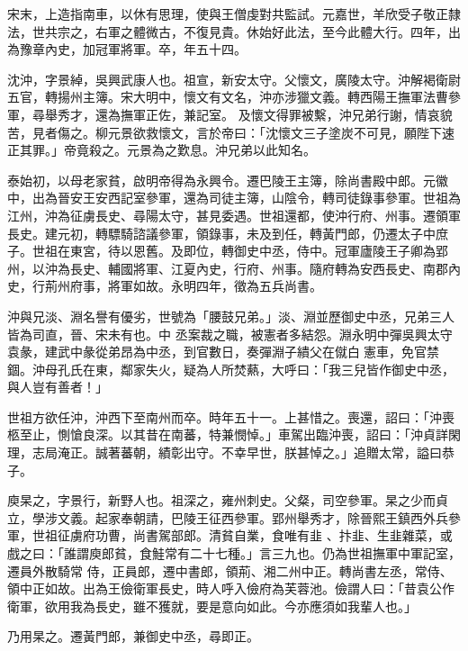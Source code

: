 \begin{pinyinscope}
 宋末，上造指南車，以休有思理，使與王僧虔對共監試。元嘉世，羊欣受子敬正隸法，世共宗之，右軍之體微古，不復見貴。休始好此法，至今此體大行。四年，出為豫章內史，加冠軍將軍。卒，年五十四。



 沈沖，字景綽，吳興武康人也。祖宣，新安太守。父懷文，廣陵太守。沖解褐衛尉五官，轉揚州主簿。宋大明中，懷文有文名，沖亦涉獵文義。轉西陽王撫軍法曹參軍，尋舉秀才，還為撫軍正佐，兼記室。
 及懷文得罪被繫，沖兄弟行謝，情哀貌苦，見者傷之。柳元景欲救懷文，言於帝曰：「沈懷文三子塗炭不可見，願陛下速正其罪。」帝竟殺之。元景為之歎息。沖兄弟以此知名。



 泰始初，以母老家貧，啟明帝得為永興令。遷巴陵王主簿，除尚書殿中郎。元徽中，出為晉安王安西記室參軍，還為司徒主簿，山陰令，轉司徒錄事參軍。世祖為江州，沖為征虜長史、尋陽太守，甚見委遇。世祖還都，使沖行府、州事。遷領軍長史。建元初，轉驃騎諮議參軍，領錄事，未及到任，轉黃門郎，仍遷太子中庶子。世祖在東宮，待以恩舊。及即位，轉御史中丞，侍中。冠軍廬陵王子卿為郢州，以沖為長史、輔國將軍、江夏內史，行府、州事。隨府轉為安西長史、南郡內史，行荊州府事，將軍如故。永明四年，徵為五兵尚書。



 沖與兄淡、淵名譽有優劣，世號為「腰鼓兄弟。」淡、淵並歷御史中丞，兄弟三人皆為司直，晉、宋未有也。中
 丞案裁之職，被憲者多結怨。淵永明中彈吳興太守袁彖，建武中彖從弟昂為中丞，到官數日，奏彈淵子繢父在僦白憲車，免官禁錮。沖母孔氏在東，鄰家失火，疑為人所焚爇，大呼曰：「我三兒皆作御史中丞，與人豈有善者！」



 世祖方欲任沖，沖西下至南州而卒。時年五十一。上甚惜之。喪還，詔曰：「沖喪柩至止，惻愴良深。以其昔在南蕃，特兼憫悼。」車駕出臨沖喪，詔曰：「沖貞詳閑理，志局淹正。誠著蕃朝，績彰出守。不幸早世，朕甚悼之。」追贈太常，謚曰恭子。


庾杲之，字景行，新野人也。祖深之，雍州刺史。父粲，司空參軍。杲之少而貞立，學涉文義。起家奉朝請，巴陵王征西參軍。郢州舉秀才，除晉熙王鎮西外兵參軍，世祖征虜府功曹，尚書駕部郎。清貧自業，食唯有韭
 、抃韭、生韭雜菜，或戲之曰：「誰謂庾郎貧，食鮭常有二十七種。」言三九也。仍為世祖撫軍中軍記室，遷員外散騎常
 侍，正員郎，遷中書郎，領荊、湘二州中正。轉尚書左丞，常侍、領中正如故。出為王儉衛軍長史，時人呼入儉府為芙蓉池。儉謂人曰：「昔袁公作衛軍，欲用我為長史，雖不獲就，要是意向如此。今亦應須如我輩人也。」



 乃用杲之。遷黃門郎，兼御史中丞，尋即正。




\end{pinyinscope}
